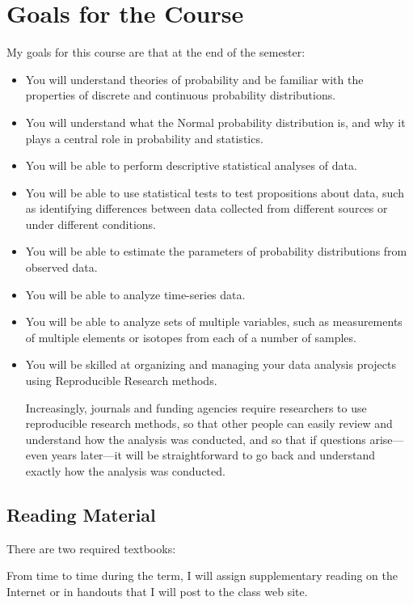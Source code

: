 \documentclass[11pt,twoside]{jgsyllabus}\usepackage[]{graphicx}\usepackage[]{xcolor}
\begin{document}
\section[Goals]{Goals for the Course}
My goals for this course are that at the end of the semester:
\begin{itemize}
\item You will understand theories of probability and be familiar with the
  properties of discrete and continuous probability distributions.
\item You will understand what the Normal probability distribution is, and why
  it plays a central role in probability and statistics.
\item You will be able to perform descriptive statistical analyses of data.
\item You will be able to use statistical tests to test propositions about data,
  such as identifying differences between data collected from different sources
  or under different conditions.
\item You will be able to estimate the parameters of probability distributions
  from observed data.
\item You will be able to analyze time-series data.
\item You will be able to analyze sets of multiple variables,
  such as measurements of multiple elements or isotopes from each of a number
  of samples.
\item You will be skilled at organizing and managing your data analysis projects
  using Reproducible Research methods.

  Increasingly, journals and funding agencies require researchers to use
  reproducible research methods, so that other people can easily review and
  understand how the analysis was conducted, and so that if questions
  arise---even years later---it will be straightforward to go back and
  understand exactly how the analysis was conducted.
\end{itemize}
\fi
%
%
%
%
%
%
\subsection{Reading Material}
There are two required textbooks:

From time to time during the term, I will assign supplementary reading on the
Internet or in handouts that I will post to the class web site.
\end{document}
